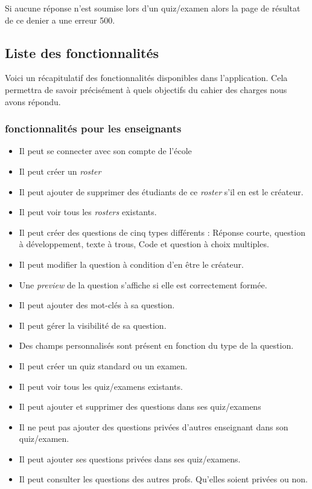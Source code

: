 Si aucune réponse n'est soumise lors d'un quiz/examen alors la page de résultat de ce denier a une erreur 500.

\subsection{Liste des fonctionnalités}
Voici un récapitulatif des fonctionnalités disponibles dans l'application. Cela permettra de savoir précisément à quels objectifs du cahier des charges nous avons répondu.

\subsubsection{fonctionnalités pour les enseignants}
\begin{itemize}
    \item Il peut se connecter avec son compte de l'école
    \item Il peut créer un \emph{roster}
    \item Il peut ajouter de supprimer des étudiants de ce \emph{roster} s'il en est le créateur.
    \item Il peut voir tous les \emph{rosters} existants.
    \item Il peut créer des questions de cinq types différents : Réponse courte, question à développement, texte à trous, Code et question à choix multiples.
    \item Il peut modifier la question à condition d'en être le créateur.
    \item Une \emph{preview} de la question s'affiche si elle est correctement formée.
    \item Il peut ajouter des mot-clés à sa question.
    \item Il peut gérer la visibilité de sa question.
    \item Des champs personnalisés sont présent en fonction du type de la question.
    \item Il peut créer un quiz standard ou un examen.
    \item Il peut voir tous les quiz/examens existants.
    \item Il peut ajouter et supprimer des questions dans ses quiz/examens
    \item Il ne peut pas ajouter des questions privées d'autres enseignant dans son quiz/examen.
    \item Il peut ajouter ses questions privées dans ses quiz/examens.
    \item Il peut consulter les questions des autres profs. Qu'elles soient privées ou non.

\end{itemize}
